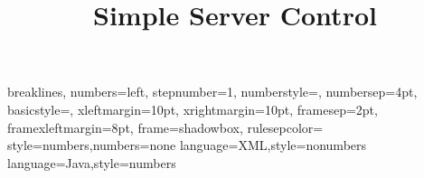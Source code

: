 \setlength{\parskip}{1ex plus 0.5ex minus 0.2ex}

\title{Simple Server Control}

\newcommand{\sscontrol}{\textit{Simple Server Control}}
\newcommand{\code}{\texttt}
\newcommand{\parameter}[1]{``\texttt{#1}'' Parameter}
\newcommand{\directive}[1]{``\texttt{#1}'' Direktive}
\newcommand{\variable}[1]{``\texttt{#1}'' Variable}

{breaklines, numbers=left, stepnumber=1, numberstyle=\tiny, numbersep=4pt, basicstyle=\scriptsize\ttfamily, 
xleftmargin=10pt, xrightmargin=10pt,
framesep=2pt, framexleftmargin=8pt, frame=shadowbox, rulesepcolor=\color{blue}}
{style=numbers,numbers=none}
{language=XML,style=nonumbers}
{language=Java,style=numbers}
